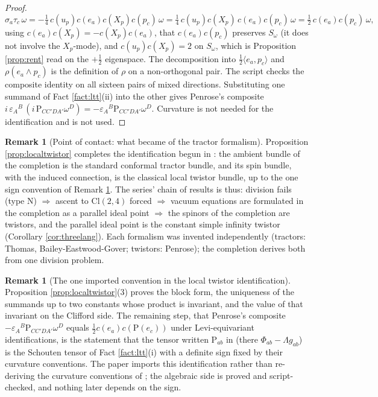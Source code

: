 \documentclass[11pt]{article}
\theoremstyle{definition}
\newtheorem{remark}[theorem]{Remark}
\newcommand{\Cl}{\mathrm{Cl}}
\newcommand{\ip}[2]{\langle #1, #2\rangle}
\newcommand{\Som}{S_\omega}
\begin{document}
\begin{proof}
\[
\sigma_a\tau_c\,\omega = -\tfrac14\,c(u_p)c(e_a)c(X_p)c(p_c)\,\omega = \tfrac14\,c(u_p)c(X_p)\,c(e_a)c(p_c)\,\omega = \tfrac12\,c(e_a)c(p_c)\,\omega ,
\]
using $c(e_a)c(X_p) = -c(X_p)c(e_a)$, that $c(e_a)c(p_c)$ preserves $\Som$ (it does not involve the $X_p$-mode), and $c(u_p)c(X_p) = 2$ on $\Som$, which is Proposition \ref{prop:rent} read on the $+\tfrac12$ eigenspace. The decomposition into $\tfrac12\ip{e_a}{p_c}$ and $\rho(e_a\wedge p_c)$ is the definition of $\rho$ on a non-orthogonal pair. The script checks the composite identity on all sixteen pairs of mixed directions. Substituting one summand of Fact \ref{fact:ltt}(ii) into the other gives Penrose's composite $i\,\varepsilon_A{}^B\,(i\,\mathrm{P}_{CC'DA'}\omega^D) = -\varepsilon_A{}^B\mathrm{P}_{CC'DA'}\omega^D$. Curvature is not needed for the identification and is not used.
\end{proof}

\begin{remark}[Point of contact: what became of the tractor formalism]\label{rem:touchtractor}
Proposition \ref{prop:localtwistor} completes the identification begun in \cite{ButlerT6}: the ambient bundle of the completion is the standard conformal tractor bundle, and its spin bundle, with the induced connection, is the classical local twistor bundle, up to the one sign convention of Remark \ref{rem:ltconvention}. The series' chain of results is thus: division fails (type N) $\Rightarrow$ ascent to $\Cl(2,4)$ forced \cite{ButlerT1} $\Rightarrow$ vacuum equations are formulated in the completion as a parallel ideal point \cite{ButlerT6} $\Rightarrow$ the spinors of the completion are twistors, and the parallel ideal point is the constant simple infinity twistor (Corollary \ref{cor:threelang}). Each formalism was invented independently (tractors: Thomas, Bailey-Eastwood-Gover; twistors: Penrose); the completion derives both from one division problem.
\end{remark}

\begin{remark}[The one imported convention in the local twistor identification]\label{rem:ltconvention}
Proposition \ref{prop:localtwistor}(3) proves the block form, the uniqueness of the summands up to two constants whose product is invariant, and the value of that invariant on the Clifford side. The remaining step, that Penrose's composite $-\varepsilon_A{}^B\mathrm{P}_{CC'DA'}\omega^D$ equals $\tfrac12 c(e_a)c(\mathrm{P}(e_c))$ under Levi-equivariant identifications, is the statement that the tensor written $\mathrm{P}_{ab}$ in \cite{PenroseRindler86} (there $\Phi_{ab} - \Lambda g_{ab}$) is the Schouten tensor of Fact \ref{fact:ltt}(i) with a definite sign fixed by their curvature conventions. The paper imports this identification rather than re-deriving the curvature conventions of \cite{PenroseRindler86}; the algebraic side is proved and script-checked, and nothing later depends on the sign.
\end{remark}
\end{document}
